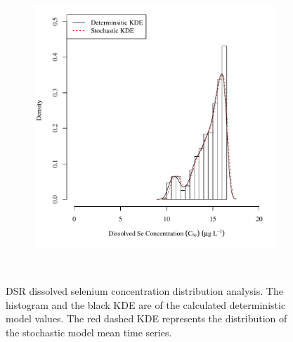 \begin{landscape}
\begin{figure}
\begin{subfigure}{0.7\textwidth}
			\includegraphics[width=\tableCustomSize]{"Figures/Results_DSR/Stochastic/c d&s est D106C"}
		\end{subfigure}\\
		\caption[DSR dissolved selenium concentration distribution analysis.]{DSR dissolved selenium concentration distribution analysis.  The histogram and the black KDE are of the calculated deterministic model values.  The red dashed KDE represents the distribution of the stochastic model mean time series.}
		\label{fig:concCSeDist_DS}
	\end{figure}
\end{landscape}

